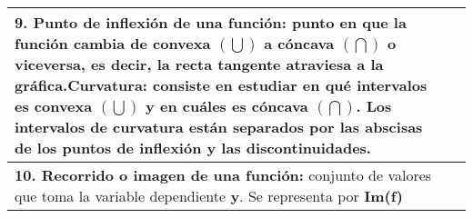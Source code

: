 \begin{table}[]
\begin{tabular}{|p{5cm}|l|}
		\textbf{9. Punto de inflexión de una función:} punto en que la función cambia de convexa $(\bigcup)$ a cóncava $(\bigcap)$ o viceversa, es decir, la recta tangente atraviesa a la gráfica.\newline \textbf{Curvatura:} consiste en estudiar en qué intervalos es convexa $(\bigcup)$ y en cuáles es cóncava $(\bigcap)$. Los intervalos de curvatura están separados por las abscisas de los puntos de inflexión y las discontinuidades. &          \\ \hline
		\textbf{10. Recorrido o imagen de una función:} conjunto de valores que toma la variable dependiente \textbf{y}. Se representa por \textbf{Im(f)} &          \\ \hline
	\end{tabular}
	
\end{table}

